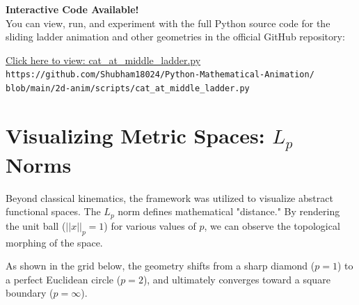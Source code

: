 \documentclass[12pt, a4paper]{report}
\begin{document}
\begin{mdframed}[backgroundcolor=gray!10, linecolor=black, linewidth=1pt, roundcorner=5pt]
    \centering
    \textbf{Interactive Code Available!} \\
    \vspace{0.2cm}
    You can view, run, and experiment with the full Python source code for the sliding ladder animation and other geometries in the official GitHub repository: \\
    \vspace{0.3cm}
    
    \small 
    \href{https://github.com/Shubham18024/Python-Mathematical-Animation/blob/main/2d-anim/scripts/cat_at_middle_ladder.py}{
        \color{blue}\underline{Click here to view: cat\_at\_middle\_ladder.py}
    } \\
    \vspace{0.1cm}
    \scriptsize \texttt{https://github.com/Shubham18024/Python-Mathematical-Animation/} \\
    \texttt{blob/main/2d-anim/scripts/cat\_at\_middle\_ladder.py}
\end{mdframed}

\newpage

\section{Visualizing Metric Spaces: $L_p$ Norms}

Beyond classical kinematics, the framework was utilized to visualize abstract functional spaces. The $L_p$ norm defines mathematical "distance." By rendering the unit ball ($||x||_p = 1$) for various values of $p$, we can observe the topological morphing of the space. 

As shown in the grid below, the geometry shifts from a sharp diamond ($p=1$) to a perfect Euclidean circle ($p=2$), and ultimately converges toward a square boundary ($p=\infty$).
\end{document}
